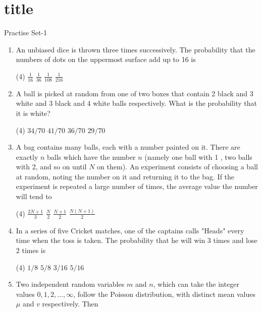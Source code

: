 \chapter{title}
\newpage
\begin{abox}
	Practise Set-1
\end{abox}
\begin{enumerate}[label=\color{ocre}\textbf{\arabic*.}]
	\item An unbiased dice is thrown three times successively. The probability that the numbers of dots on the uppermost surface add up to 16 is
{}
\begin{tasks}(4)
	\task[\textbf{A.}] $\frac{1}{16}$
	\task[\textbf{B.}] $\frac{1}{36}$
	\task[\textbf{C.}] $\frac{1}{108}$
	\task[\textbf{D.}] $\frac{1}{216}$
\end{tasks}
\item A ball is picked at random from one of two boxes that contain 2 black and 3 white and 3 black and 4 white balls respectively. What is the probability that it is white?
{}
\begin{tasks}(4)
	\task[\textbf{A.}] $34 / 70$
	\task[\textbf{B.}] $41 / 70$
	\task[\textbf{C.}] $36 / 70$
	\task[\textbf{D.}] $29 / 70$
\end{tasks}
\item  A bag contains many balls, each with a number painted on it. There are exactly $n$ balls which have the number $n$ (namely one ball with 1 , two balls with 2, and so on until $N$ on them). An experiment consists of choosing a ball at random, noting the number on it and returning it to the bag. If the experiment is repeated a large number of times, the average value the number will tend to
{}
\begin{tasks}(4)
	\task[\textbf{A.}] $\frac{2 N+1}{3}$
	\task[\textbf{B.}] $\frac{N}{2}$
	\task[\textbf{C.}] $\frac{N+1}{2}$
	\task[\textbf{D.}] $\frac{N(N+1)}{2}$
\end{tasks}
\item  In a series of five Cricket matches, one of the captains calls "Heads" every time when the toss is taken. The probability that he will win 3 times and lose 2 times is
{}
\begin{tasks}(4)
	\task[\textbf{A.}] $1 / 8$
	\task[\textbf{B.}]  $5 / 8$
	\task[\textbf{C.}] $3 / 16$
	\task[\textbf{D.}] $5 / 16$
\end{tasks}
\item  Two independent random variables $m$ and $n$, which can take the integer values $0,1,2, \ldots, \infty$, follow the Poisson distribution, with distinct mean values $\mu$ and $v$ respectively. Then

\end{enumerate}
